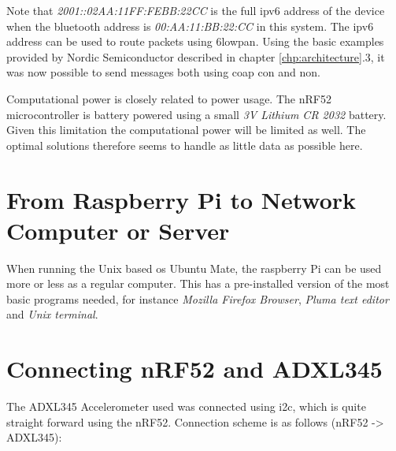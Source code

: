 Note that \textit{2001::02AA:11FF:FEBB:22CC} is the full \gls{ipv6} address of the device when the bluetooth address is \textit{00:AA:11:BB:22:CC} in this system. The \gls{ipv6} address can be used to route packets using \gls{6lowpan}. Using the basic examples provided by Nordic Semiconductor described in chapter \ref{chp:architecture}.3, it was now possible to send messages both using \gls{coap} \gls{con} and \gls{non}.  

Computational power is closely related to power usage. The nRF52 microcontroller is battery powered using a small \textit{3V Lithium CR 2032} battery. Given this limitation the computational power will be limited as well. The optimal solutions therefore seems to handle as little data as possible here. 

\section{From Raspberry Pi to Network Computer or Server}

When running the Unix based \gls{os} Ubuntu Mate, the raspberry Pi can be used more or less as a regular computer. This has a pre-installed version of the most basic programs needed, for instance \textit{Mozilla Firefox Browser}, \textit{Pluma text editor} and \textit{Unix terminal}. 


\section{Connecting nRF52 and ADXL345}


The ADXL345 Accelerometer used was connected using \gls{i2c}, which is quite straight forward using the nRF52. Connection scheme is as follows (nRF52 -> ADXL345): 


